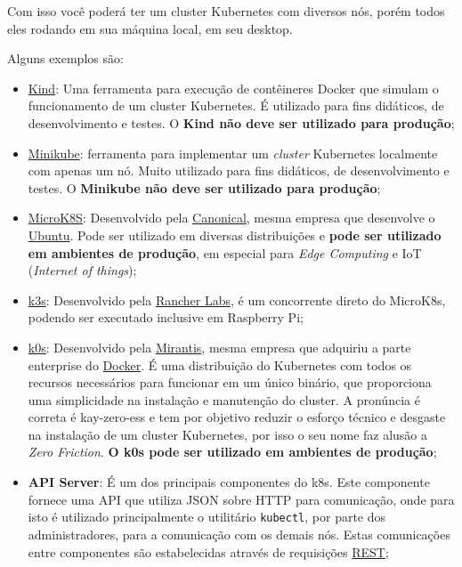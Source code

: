 \documentclass[12pt,a4paper]{article}
\begin{document}
Com isso você poderá ter um cluster Kubernetes com diversos nós, porém todos eles rodando em sua máquina local, em seu desktop.

Alguns exemplos são:

\begin{itemize}
    \item \href{https://kind.sigs.k8s.io/docs/user/quick-start}{Kind}: Uma ferramenta para execução de contêineres Docker que simulam o funcionamento de um cluster Kubernetes. É utilizado para fins didáticos, de desenvolvimento e testes. O \textbf{Kind não deve ser utilizado para produção};
    \item \href{https://github.com/kubernetes/minikube}{Minikube}: ferramenta para implementar um \textit{cluster} Kubernetes localmente com apenas um nó. Muito utilizado para fins didáticos, de desenvolvimento e testes. O \textbf{Minikube não deve ser utilizado para produção};
    \item \href{https://microk8s.io}{MicroK8S}: Desenvolvido pela \href{https://canonical.com}{Canonical}, mesma empresa que desenvolve o \href{https://ubuntu.com}{Ubuntu}. Pode ser utilizado em diversas distribuições e \textbf{pode ser utilizado em ambientes de produção}, em especial para \textit{Edge Computing} e IoT (\textit{Internet of things});
    \item \href{https://k3s.io}{k3s}: Desenvolvido pela \href{https://rancher.com}{Rancher Labs}, é um concorrente direto do MicroK8s, podendo ser executado inclusive em Raspberry Pi;
    \item \href{https://k0sproject.io}{k0s}: Desenvolvido pela \href{https://www.mirantis.com}{Mirantis}, mesma empresa que adquiriu a parte enterprise do \href{https://www.docker.com}{Docker}. É uma distribuição do Kubernetes com todos os recursos necessários para funcionar em um único binário, que proporciona uma simplicidade na instalação e manutenção do cluster. A pronúncia é correta é kay-zero-ess e tem por objetivo reduzir o esforço técnico e desgaste na instalação de um cluster Kubernetes, por isso o seu nome faz alusão a \textit{Zero Friction}. \textbf{O k0s pode ser utilizado em ambientes de produção};
    \item \textbf{API Server}: É um dos principais componentes do k8s. Este componente fornece uma API que utiliza JSON sobre HTTP para comunicação, onde para isto é utilizado principalmente o utilitário \texttt{kubectl}, por parte dos administradores, para a comunicação com os demais nós. Estas comunicações entre componentes são estabelecidas através de requisições \href{https://restfulapi.net}{REST};

\end{itemize}
\end{document}
